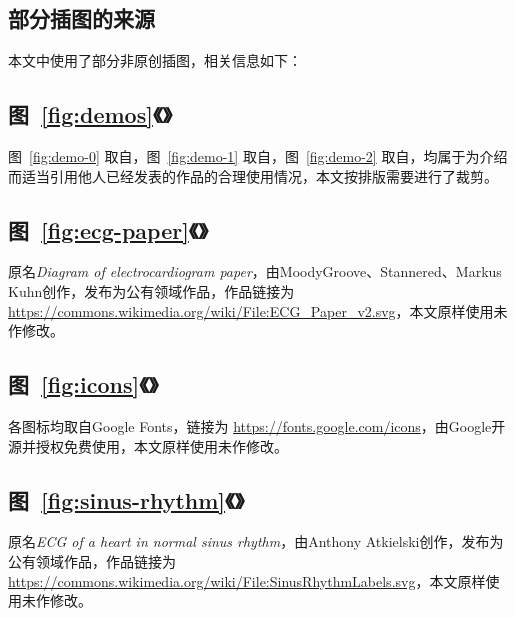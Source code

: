 

\begin{appendix}

    \begingroup
    \renewcommand{\clearpage}{\relax}
    \listoftodos
    \endgroup

    \listoffigures
    \listoffigureEng


    \chapter*{部分插图的来源}\label{ch:license}

    本文中使用了部分非原创插图，相关信息如下：

    \section*{图~\ref{fig:demos}《》}

    图~\ref{fig:demo-0} 取自\cite{chenJiyushenduxuexidexindianfenximoxingdeshejiyuyouhua2021}，图~\ref{fig:demo-1} 取自\cite{liuJiyuyidongzhongduanfenxidekechuandairouxingxindianjiancexitong2021}，图~\ref{fig:demo-2} 取自\cite{jinPredictingCardiovascularDisease2009}，均属于为介绍而适当引用他人已经发表的作品的合理使用情况，本文按排版需要进行了裁剪。

    \section*{图~\ref{fig:ecg-paper}《》}

    原名\textit{Diagram of electrocardiogram paper}，由MoodyGroove、Stannered、Markus Kuhn创作，发布为公有领域作品，作品链接为 \url{https://commons.wikimedia.org/wiki/File:ECG_Paper_v2.svg}，本文原样使用未作修改。

    \section*{图~\ref{fig:icons}《》}

    各图标均取自Google Fonts，链接为 \url{https://fonts.google.com/icons}，由Google开源并授权免费使用，本文原样使用未作修改。

    \section*{图~\ref{fig:sinus-rhythm}《》}

    原名\textit{ECG of a heart in normal sinus rhythm}，由Anthony Atkielski创作，发布为公有领域作品，作品链接为 \url{https://commons.wikimedia.org/wiki/File:SinusRhythmLabels.svg}，本文原样使用未作修改。

\end{appendix}
